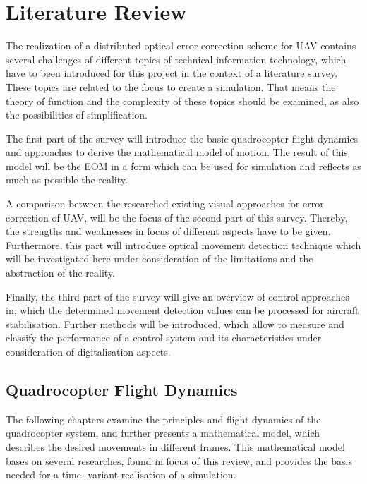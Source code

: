 
\chapter{Literature Review} %
\label{mt:c:LiteratureReview}

The realization of a distributed optical error correction scheme for \gls{UAV}
contains several challenges of different topics of technical information
technology, which have to been introduced for this project in the context of a
literature survey. These topics are related to the focus to create a
simulation. That means the theory of function and the complexity of these topics
should be examined, as also the possibilities of simplification.

The first part of the survey will introduce the basic quadrocopter flight
dynamics and approaches to derive the mathematical model of motion. The result of
this model will be the \gls{EOM} in a form which can be used for simulation and
reflects as much as possible the reality.

A comparison between the researched existing visual approaches for error correction of
\gls{UAV}, will be the focus of the second part of this survey. Thereby, the strengths
and weaknesses in focus of different aspects have to be given. Furthermore, this
part will introduce optical movement detection technique which will be
investigated here under consideration of the limitations and the abstraction of
the reality.

\newpage
Finally, the third part of the survey will give an overview of control approaches
in, which the determined movement detection values can be processed for aircraft
stabilisation. Further methods will be introduced, which allow to measure and
classify the performance of a control system and its characteristics under
consideration of digitalisation aspects.

\section{Quadrocopter Flight Dynamics}
\label{mt:c:LiteratureReview:QuadrocopterFlightDynamics}

The following chapters examine the principles and flight dynamics of the quadrocopter system, and further presents a mathematical model, which describes the desired movements in different frames. This mathematical model bases on several researches, found in focus of this review, and provides the basis needed for a time- variant realisation of a simulation.  

